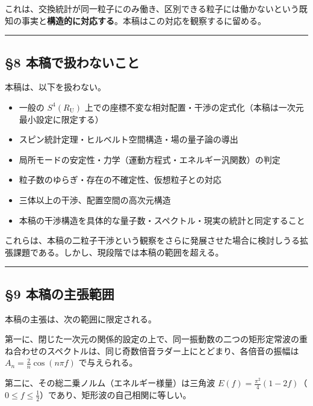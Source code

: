 \documentclass[
]{ltjsarticle}
\providecommand{\tightlist}{%
  \setlength{\itemsep}{0pt}\setlength{\parskip}{0pt}}
\begin{document}
これは、交換統計が同一粒子にのみ働き、区別できる粒子には働かないという既知の事実と\textbf{構造的に対応する}。本稿はこの対応を観察するに留める。

\begin{center}\rule{0.5\linewidth}{0.5pt}\end{center}

\subsection{§8
本稿で扱わないこと}\label{ux672cux7a3fux3067ux6271ux308fux306aux3044ux3053ux3068}

本稿は、以下を扱わない。

\begin{itemize}
\tightlist
\item
  一般の \(S^4(R_{\mathrm U})\)
  上での座標不変な相対配置・干渉の定式化（本稿は一次元最小設定に限定する）
\item
  スピン統計定理・ヒルベルト空間構造・場の量子論の導出
\item
  局所モードの安定性・力学（運動方程式・エネルギー汎関数）の判定
\item
  粒子数のゆらぎ・存在の不確定性、仮想粒子との対応
\item
  三体以上の干渉、配置空間の高次元構造
\item
  本稿の干渉構造を具体的な量子数・スペクトル・現実の統計と同定すること
\end{itemize}

これらは、本稿の二粒子干渉という観察をさらに発展させた場合に検討しうる拡張課題である。しかし、現段階では本稿の範囲を超える。

\begin{center}\rule{0.5\linewidth}{0.5pt}\end{center}

\subsection{§9
本稿の主張範囲}\label{ux672cux7a3fux306eux4e3bux5f35ux7bc4ux56f2}

本稿の主張は、次の範囲に限定される。

第一に、閉じた一次元の関係的設定の上で、同一振動数の二つの矩形定常波の重ね合わせのスペクトルは、同じ奇数倍音ラダー上にとどまり、各倍音の振幅は
\(A_n=\tfrac{2}{n}\cos(n\pi f)\) で与えられる。

第二に、その総二乗ノルム（エネルギー様量）は三角波
\(E(f)=\tfrac{\pi^2}{4}(1-2f)\)（\(0\le f\le\tfrac12\)）であり、矩形波の自己相関に等しい。
\end{document}
